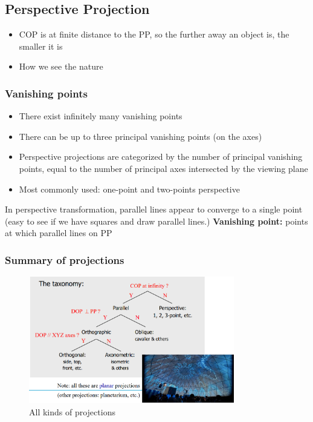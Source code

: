 \documentclass[11pt]{article}
\begin{document}
\subsection{Perspective Projection}
\begin{itemize}
    \item COP is at finite distance to the PP, so the further away an object is, the smaller it is
    \item How we see the nature
\end{itemize}

\subsubsection*{Vanishing points}
\begin{itemize}
    \item There exist infinitely many vanishing points
    \item There can be up to three principal vanishing points (on the axes)
    \item Perspective projections are categorized by the number of principal vanishing points, equal to the number of principal axes intersected by the viewing plane
    \item Most commonly used: one-point and two-points perspective
\end{itemize}

In perspective transformation, parallel lines appear to converge to a single point (easy to see if we have squares and draw parallel lines.)\newline
\textbf{Vanishing point: } points at which parallel lines on PP  
\subsubsection*{Summary of projections}

\begin{figure}[H]
    \centering
    \includegraphics[width=0.8\textwidth]{summ_projections.png}
    \caption{All kinds of projections}
    \label{fig:summ_projections}
\end{figure}
\end{document}
